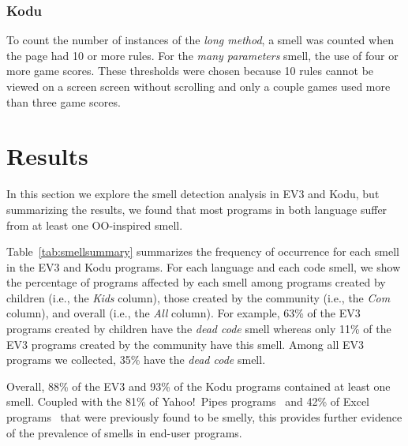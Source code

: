 \documentclass[conference]{IEEEtran}
\begin{document}
\subsubsection{Kodu}
To count the number of instances of the \emph{long method}, a smell was counted when the page had 10 or more rules. For the  \emph{many parameters} smell, the use of four or more game scores. These thresholds were chosen because 10 rules cannot be viewed on a screen screen without scrolling and only a couple games used more than three game scores. 


\section{Results}
\label{sec:results}
In this section we explore the smell detection analysis in EV3 and Kodu, but summarizing the results, we found that most programs in both language suffer from at least one OO-inspired smell. 

Table~\ref{tab:smellsummary} summarizes the frequency of occurrence for each smell in the EV3 and Kodu programs. 
For each language and each code smell, we show the percentage of programs affected by each smell among programs created by children (i.e., the \emph{Kids} column), those created by the community (i.e., the \emph{Com} column), and overall (i.e., the \emph{All} column). For example, 63\% of the EV3 programs created by children have the \emph{dead code} smell whereas only 11\% of the EV3 programs created by the community have this smell. Among all EV3 programs we collected, 35\% have the \emph{dead code} smell. 
 
Overall, 88\% of the EV3 and 93\% of the Kodu programs contained at least one smell. Coupled with the 81\% of Yahoo!\ Pipes programs~\cite{StoleeTSE2013} and 42\% of Excel programs~\cite{Hermans2012intra} that were previously found to be smelly, this provides further evidence of the prevalence of smells in end-user programs. 
\end{document}
